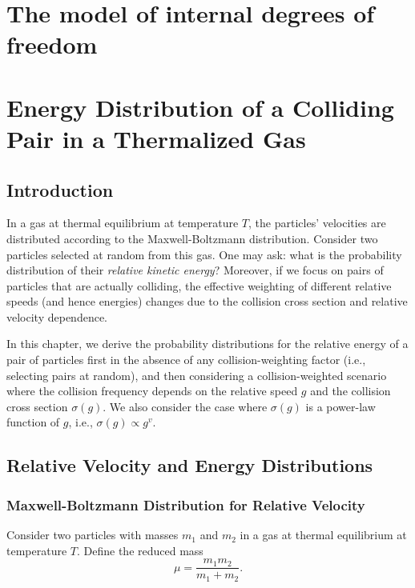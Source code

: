 \chapter{The model of internal degrees of freedom}


\chapter{Energy Distribution of a Colliding Pair in a Thermalized Gas}

\section{Introduction}

In a gas at thermal equilibrium at temperature $T$, the particles' velocities are distributed according to the Maxwell-Boltzmann distribution. Consider two particles selected at random from this gas. One may ask: what is the probability distribution of their \emph{relative kinetic energy}? Moreover, if we focus on pairs of particles that are actually colliding, the effective weighting of different relative speeds (and hence energies) changes due to the collision cross section and relative velocity dependence.

In this chapter, we derive the probability distributions for the relative energy of a pair of particles first in the absence of any collision-weighting factor (i.e., selecting pairs at random), and then considering a collision-weighted scenario where the collision frequency depends on the relative speed $g$ and the collision cross section $\sigma(g)$. We also consider the case where $\sigma(g)$ is a power-law function of $g$, i.e., $\sigma(g) \propto g^{v}$.

\section{Relative Velocity and Energy Distributions}

\subsection{Maxwell-Boltzmann Distribution for Relative Velocity}

Consider two particles with masses $m_1$ and $m_2$ in a gas at thermal equilibrium at temperature $T$. Define the reduced mass
\begin{equation}
  \mu = \frac{m_1 m_2}{m_1 + m_2}.
\end{equation}

